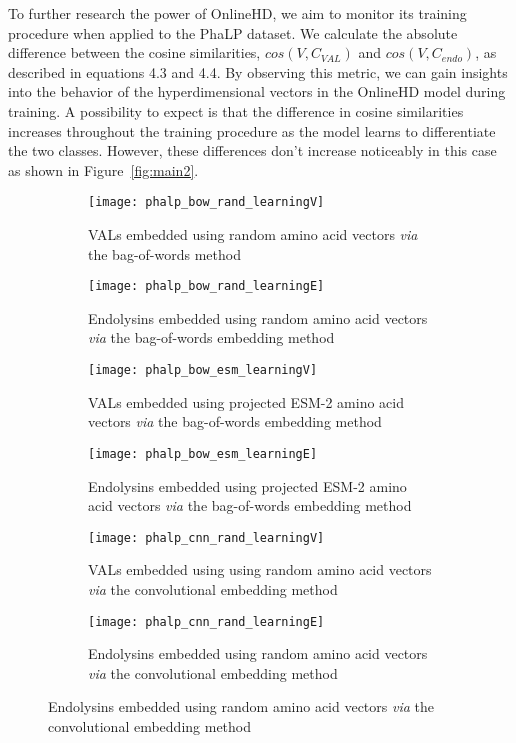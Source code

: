 To further research the power of OnlineHD, we aim to monitor its training procedure when applied to the PhaLP dataset. We calculate the absolute difference between the cosine similarities, $cos(V, C_{VAL})$ and $cos(V, C_{endo})$, as described in equations 4.3 and 4.4. By observing this metric, we can gain insights into the behavior of the hyperdimensional vectors in the OnlineHD model during training. A possibility to expect is that the difference in cosine similarities increases throughout the training procedure as the model learns to differentiate the two classes. However, these differences don't increase noticeably in this case as shown in Figure~\ref{fig:main2}.

\begin{figure}[ht!]
    \centering
    \begin{subfigure}{0.48\textwidth}
        \texttt{[image: phalp\_bow\_rand\_learningV]}
        \caption{VALs embedded using random amino acid vectors \textit{via} the bag-of-words method}
        \label{fig:subfig-a}
    \end{subfigure}
    \hfill
    \begin{subfigure}{0.48\textwidth}
        \texttt{[image: phalp\_bow\_rand\_learningE]}
        \caption{Endolysins embedded using random amino acid vectors \textit{via} the bag-of-words embedding method}
        \label{fig:subfig-b}
    \end{subfigure}
    
    \begin{subfigure}{0.48\textwidth}
        \texttt{[image: phalp\_bow\_esm\_learningV]}
        \caption{VALs embedded using projected ESM-2 amino acid vectors \textit{via} the bag-of-words embedding method}
        \label{fig:subfig-c}
    \end{subfigure}
    \hfill
    \begin{subfigure}{0.48\textwidth}
        \texttt{[image: phalp\_bow\_esm\_learningE]}
        \caption{Endolysins embedded using projected ESM-2 amino acid vectors \textit{via} the bag-of-words embedding method}
        \label{fig:subfig-d}
    \end{subfigure}
    
    \begin{subfigure}{0.48\textwidth}
        \texttt{[image: phalp\_cnn\_rand\_learningV]}
        \caption{VALs embedded using using random amino acid vectors \textit{via} the convolutional embedding method}
        \label{fig:subfig-e}
    \end{subfigure}
    \hfill
    \begin{subfigure}{0.48\textwidth}
        \texttt{[image: phalp\_cnn\_rand\_learningE]}
        \caption{Endolysins embedded using random amino acid vectors \textit{via} the convolutional embedding method}
        \label{fig:subfig-f}
    \end{subfigure}
    

\end{figure}
